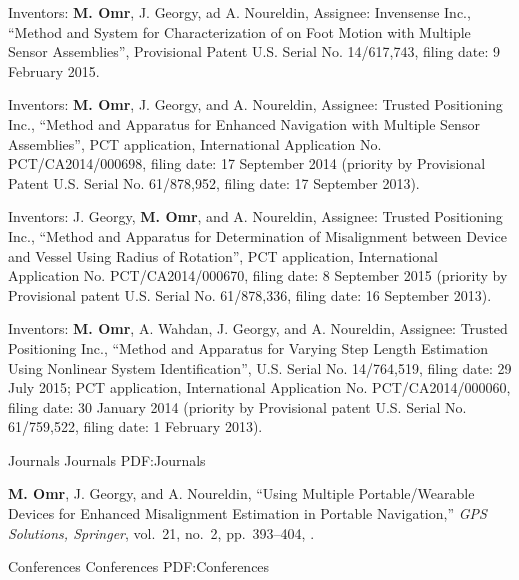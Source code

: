 \documentclass[letterpaper,MMMyyyy,nonstopmode]{simpleresumecv}
\begin{document}
\begin{Body}
\Gap
\NumberedItem{[2]}
Inventors: \textbf{M. Omr}, J. Georgy, ad A. Noureldin, Assignee: Invensense Inc., “Method and System for Characterization of on Foot Motion with Multiple Sensor Assemblies”, Provisional Patent U.S. Serial No. 14/617,743, filing date: 9 February 2015.

\Gap
\NumberedItem{[3]}
Inventors: \textbf{M. Omr}, J. Georgy, and A. Noureldin, Assignee: Trusted Positioning Inc., “Method and Apparatus for Enhanced Navigation with Multiple Sensor Assemblies”, PCT application, International Application No. PCT/CA2014/000698, filing date: 17 September 2014 (priority by Provisional Patent U.S. Serial No. 61/878,952, filing date: 17 September 2013).

\Gap
\NumberedItem{[4]}
Inventors: J. Georgy, \textbf{M. Omr}, and A. Noureldin, Assignee: Trusted Positioning Inc., “Method and Apparatus for Determination of Misalignment between Device and Vessel Using Radius of Rotation”, PCT application, International Application No. PCT/CA2014/000670, filing date: 8 September 2015 (priority by Provisional patent U.S. Serial No. 61/878,336, filing date: 16 September 2013).

\Gap
\NumberedItem{[5]}
Inventors: \textbf{M. Omr}, A. Wahdan, J. Georgy, and A. Noureldin, Assignee: Trusted Positioning Inc., “Method and Apparatus for Varying Step Length Estimation Using Nonlinear System Identification”, U.S. Serial No. 14/764,519, filing date: 29 July 2015; PCT application, International Application No. PCT/CA2014/000060, filing date: 30 January 2014 (priority by Provisional patent U.S. Serial No. 61/759,522, filing date: 1 February 2013).


\endgroup

\BigGap

\SubSection
{Journals}
{Journals}
{PDF:Journals}

\begingroup
\renewcommand{\MaxNumberedItem}{[8]}

\Gap
\NumberedItem{[1]}
{\textbf{M. Omr}, J. Georgy, and A. Noureldin,
``Using Multiple Portable/Wearable Devices for Enhanced Misalignment Estimation in Portable Navigation,''
\textit{GPS Solutions, Springer},
vol.~21,
no.~2,
pp.~393--404,
.}

\endgroup

\BigGap
\SubSection
{Conferences}
{Conferences}
{PDF:Conferences}

\begingroup
\renewcommand{\MaxNumberedItem}{[8]}


\end{Body}
\end{document}
